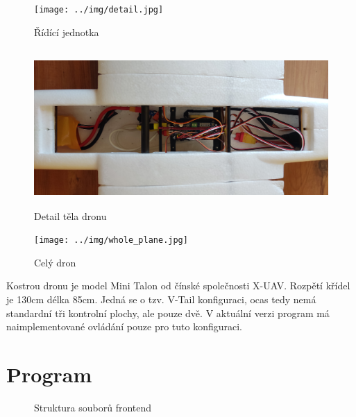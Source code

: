\documentclass[a4paper,oneside,12pt]{report}
\begin{document}
\begin{figure}[h]
  \centering
  \texttt{[image: ../img/detail.jpg]}
  \caption[Detail Raspberry Pi]{Řídící jednotka}
\end{figure}


\begin{figure}[h]
  \centering
  \includegraphics[height=6cm]{../img/body.jpg}
  \caption[Detail těla dronu]{Detail těla dronu}
\end{figure}

\begin{figure}[h]
  \centering
  \texttt{[image: ../img/whole\_plane.jpg]}
  \caption[Celý dron]{Celý dron}
\end{figure}


Kostrou dronu je model Mini Talon od čínské společnosti X-UAV.
Rozpětí křídel je 130cm délka 85cm.
Jedná se o tzv. V-Tail konfiguraci, ocas tedy nemá standardní tři kontrolní plochy, ale pouze dvě.
V aktuální verzi program má naimplementované ovládání pouze pro tuto konfiguraci.

\newpage

\section{Program}

\begin{figure}[h]
  \caption[Struktura souborů na dronu, vlastní tvorba]{Struktura souborů frontend}
\end{figure}
\end{document}
